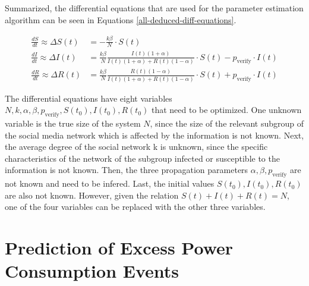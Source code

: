 Summarized, the differential equations that are used for the parameter estimation 
algorithm can be seen in Equations \ref{all-deduced-diff-equations}.

\begin{subequations}
    \begin{align}
        \frac{dS}{dt} \approx \Delta S(t) &= -\frac{k\beta}{N} \cdot S(t) \\
        \frac{dI}{dt} \approx \Delta I(t) &=  \frac{k\beta}{N} \frac{I(t)(1+\alpha)}{I(t)(1+\alpha)+R(t)(1-\alpha)}
        \cdot S(t) - p_{{\mathrm{verify}}}\cdot I(t) \\
        \frac{dR}{dt} \approx \Delta R(t) &= \frac{k\beta}{N} \frac{R(t)(1-\alpha)}{I(t)(1+\alpha)+R(t)(1-\alpha)} 
        \cdot S(t) + p_{{\mathrm{verify}}}\cdot I(t)
\end{align}
\label{all-deduced-diff-equations}
\end{subequations}


The differential equations have eight variables 
$N, k, \alpha, \beta, p_{{\mathrm{verify}}}, S(t_0), I(t_0), R(t_0)$
that need to be optimized. One unknown variable is
the true size of the system $N$, since the size of the relevant
subgroup of the social media network which is affected by the information is 
not known.
Next, the average degree of the social network k is unknown,
since the specific characteristics of the network of the
subgroup infected or susceptible to the information is not known.
Then, the three propagation parameters $\alpha, \beta, p_{{\mathrm{verify}}}$ 
are not known and need to be infered. 
Last, the initial values $S(t_0), I(t_0), R(t_0)$ are also not known.
However, given the relation $S(t)+I(t)+R(t)=N$, one of the four variables can 
be replaced with the other three variables.

\section{Prediction of Excess Power Consumption Events}

